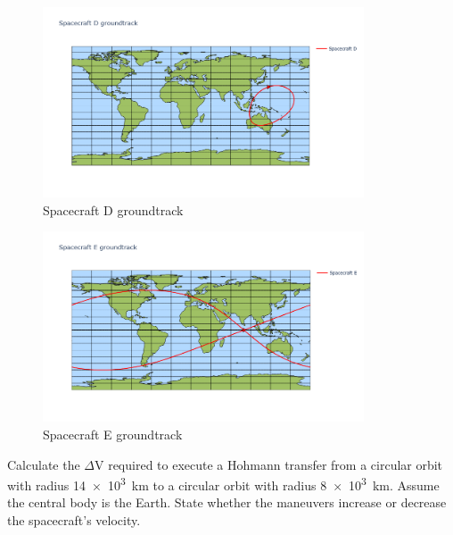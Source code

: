 \begin{hwkProblem}{2}{}
	\begin{figure}[H]
		\begin{center}
			\includegraphics[width=0.85\textwidth]{./images/s02d.png}
		\end{center}
		\caption{Spacecraft D groundtrack}\label{fig:s02d}
	\end{figure}

	

	\hwkPart

	\begin{figure}[H]
		\begin{center}
			\includegraphics[width=0.85\textwidth]{./images/s02e.png}
		\end{center}
		\caption{Spacecraft E groundtrack}\label{fig:s02e}
	\end{figure}

	

\end{hwkProblem}
\begin{hwkProblem}{3}{}

	Calculate the \( \Delta \mathrm{V} \) required to execute a Hohmann transfer from a circular orbit with radius \qty{14e3}{\km} to a circular orbit with radius \qty{8e3}{\km}. Assume the central body is the Earth. State whether the maneuvers increase or decrease the spacecraft's velocity.

	\hwkSol

\end{hwkProblem}

